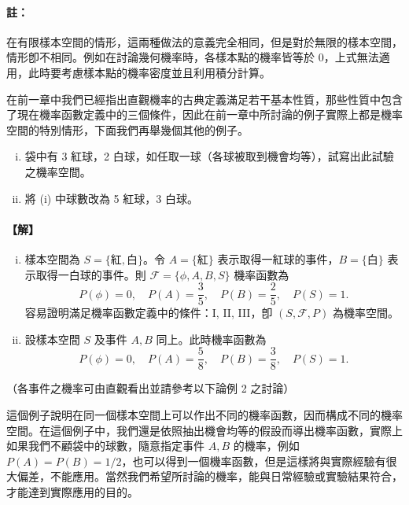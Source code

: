 \medskip
\paragraph{註：}
在有限樣本空間的情形，這兩種做法的意義完全相同，但是對於無限的樣本空間，情形卽不相同。例如在討論幾何機率時，各樣本點的機率皆等於 0，上式無法適用，此時要考慮樣本點的機率密度並且利用積分計算。

\medskip
在前一章中我們已經指出直觀機率的古典定義滿足若干基本性質，那些性質中包含了現在機率函數定義中的三個條件，因此在前一章中所討論的例子實際上都是機率空間的特別情形，下面我們再舉幾個其他的例子。

\medskip
\begin{discussion}\label{disc:b5-4-1}
\begin{enumerate}[(i), leftmargin=2em, itemsep=0.3em]
  \item 袋中有 3 紅球，2 白球，如任取一球（各球被取到機會均等），試寫出此試驗之機率空間。
  \item 將 (i) 中球數改為 5 紅球，3 白球。
\end{enumerate}
\end{discussion}
\paragraph{【解】}
\begin{enumerate}[(i), leftmargin=2em, itemsep=0.3em]
  \item 樣本空間為 $S = \{\text{紅}, \text{白}\}$。令 $A = \{\text{紅}\}$ 表示取得一紅球的事件，$B = \{\text{白}\}$ 表示取得一白球的事件。則 $\mathscr{F} = \{\phi, A, B, S\}$ 機率函數為
  \[
  P(\phi) = 0,\quad P(A) = \frac{3}{5},\quad P(B) = \frac{2}{5},\quad P(S) = 1.
  \]
  容易證明滿足機率函數定義中的條件：I, II, III，卽 $(S, \mathscr{F}, P)$ 為機率空間。

  \item 設樣本空間 $S$ 及事件 $A, B$ 同上。此時機率函數為
  \[
  P(\phi) = 0,\quad P(A) = \frac{5}{8},\quad P(B) = \frac{3}{8},\quad P(S) = 1.
  \]
\end{enumerate}
（各事件之機率可由直觀看出並請參考以下論例 2 之討論）

這個例子說明在同一個樣本空間上可以作出不同的機率函數，因而構成不同的機率空間。在這個例子中，我們還是依照抽出機會均等的假設而導出機率函數，實際上如果我們不顧袋中的球數，隨意指定事件 $A, B$ 的機率，例如 $P(A) = P(B) = 1/2$，也可以得到一個機率函數，但是這樣將與實際經驗有很大偏差，不能應用。當然我們希望所討論的機率，能與日常經驗或實驗結果符合，才能達到實際應用的目的。

